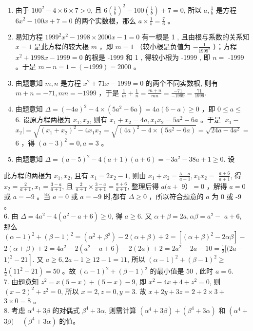 \documentclass[10pt]{article}
\begin{document}
\begin{enumerate}
  \item 由于 $100^{2}-4 \times 6 \times 7>0$, 且 $6\left(\frac{1}{b}\right)^{2}-100\left(\frac{1}{b}\right)+7=0$, 所以 $a, \frac{1}{b}$ 是方程 $6 x^{2}-100 x+7=0$ 的两个实数根，那么 $a \times \frac{1}{b}=\frac{7}{6}$ 。
  \item 易知方程 $1999^{2} x^{2}-1998 \times 2000 x-1=0$ 有一根是 1 , 且由根与系数的关系知 $x=1$ 是此方程的较大根 $m$ ，即 $m=1$ （较小根是负值为 $-\frac{1}{1999^{2}}$ ）；方程 $x^{2}+1998 x-1999=0$ 的根是 -1999 和 1 , 得较小根为 -1999 , 即 $n=$ -1999 。于是 $m-n=1-(-1999)=2000$ 。
  \item 由题意知 $m, n$ 是方程 $x^{2}+71 x-1999=0$ 的两个不同实数根, 则有 $m+n=-71, m n=-1999$ ，于是 $\frac{1}{m}+\frac{1}{n}=\frac{m+n}{m n}=\frac{-71}{-1999}=\frac{71}{1999}$.
  \item 由题意知 $\Delta=(-4 a)^{2}-4 \times\left(5 a^{2}-6 a\right)=4 a(6-a) \geqslant 0$ ，即 $0 \leqslant a \leqslant$ 6. 设原方程两根为 $x_{1}, x_{2}$, 则有 $x_{1}+x_{2}=4 a, x_{1} x_{2}=5 a^{2}-6 a$ 。于是 $\mid x_{1}-$ $x_{2} \mid=\sqrt{\left(x_{1}+x_{2}\right)^{2}-4 x_{1} x_{2}}=\sqrt{(4 a)^{2}-4 \times\left(5 a^{2}-6 a\right)}=\sqrt{24 a-4 a^{2}}=$ 6 ，得 $(a-3)^{2}=0, a=3$ 。
  \item 由题意知 $\Delta=(a-5)^{2}-4(a+1)(a+6)=-3 a^{2}-38 a+1 \geqslant 0$. 设
\end{enumerate}

此方程的两根为 $x_{1}, x_{2}$, 且有 $x_{1}=2 x_{2}-1$, 则由 $x_{1}+x_{2}=\frac{5-a}{a+1}, x_{1} x_{2}=$ $\frac{a+6}{a+1}$, 得 $x_{2}=\frac{2}{a+1}, x_{1}=\frac{3-a}{a+1}$, 且 $\frac{2}{a+1} \times \frac{3-a}{a+1}=\frac{a+6}{a+1}$, 整理后得 $a(a+$ $9）=0$ ，解得 $a=0$ 或 $a=-9$ 。当 $a=0$ 或 $a=-9$ 时,都有 $\Delta \geqslant 0$ ，所以符合题意的 $a$ 为 0 或 -9 。\\
6. 由 $\Delta=4 a^{2}-4\left(a^{2}-a+6\right) \geqslant 0$, 得 $a \geqslant 6$. 又 $\alpha+\beta=2 a, \alpha \beta=a^{2}-$ $a+6$, 那么 $(\alpha-1)^{2}+(\beta-1)^{2}=\left(\alpha^{2}+\beta^{2}\right)-2(\alpha+\beta)+2=\left[(\alpha+\beta)^{2}-2 \alpha \beta\right]-$ $2(\alpha+\beta)+2=4 a^{2}-2\left(a^{2}-a+6\right)-2(2 a)+2=2 a^{2}-2 a-10=\frac{1}{2}[(2 a-$ $\left.1)^{2}-21\right]$. 又 $a \geqslant 6,2 a-1 \geqslant 12-1=11$, 所以 $(\alpha-1)^{2}+(\beta-1)^{2} \geqslant$ $\frac{1}{2}\left(11^{2}-21\right)=50$ 。故 $(\alpha-1)^{2}+(\beta-1)^{2}$ 的最小值是 50 , 此时 $a=6$.\\
7. 由题意知 $z^{2}=x(5-x)+(5-x)-9$, 即 $x^{2}-4 x+4+z^{2}=0$, 则 $(x-2)^{2}+z^{2}=0$, 所以 $x=2, z=0, y=3$. 故 $x+2 y+3 z=2+2 \times 3+$ $3 \times 0=8$ 。\\
8. 考虑 $\alpha^{4}+3 \beta$ 的对偶式 $\beta^{4}+3 \alpha$, 则需计算 $\left(\alpha^{4}+3 \beta\right)+\left(\beta^{4}+3 \alpha\right)$ 和 $\left(\alpha^{4}+\right.$ $3 \beta)-\left(\beta^{4}+3 \alpha\right)$ 的值。
\end{document}
